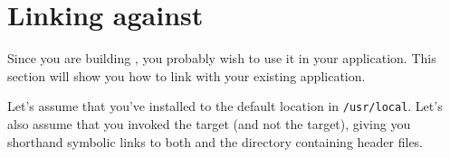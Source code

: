 %
% 

%
%




\section{Linking against \libflame}
\label{sec:linking}


Since you are building \libflamens, you probably wish to use it in your
application.
This section will show you how to link \libflame with your existing application.

Let's assume that you've installed \libflame to the default location in
{\tt /usr/local}.
Let's also assume that you invoked the \install target (and not the
\installwithoutsymlinks target), giving
you shorthand symbolic links to both \libflame and the directory containing
header files.

